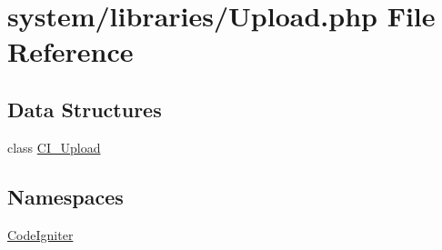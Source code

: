 \hypertarget{_upload_8php}{\section{system/libraries/\-Upload.php File Reference}
\label{_upload_8php}
}
\subsection*{Data Structures}
\begin{DoxyCompactItemize}
\item 
class \hyperlink{class_c_i___upload}{C\-I\-\_\-\-Upload}
\end{DoxyCompactItemize}
\subsection*{Namespaces}
\begin{DoxyCompactItemize}
\item 
\hyperlink{namespace_code_igniter}{Code\-Igniter}
\end{DoxyCompactItemize}
